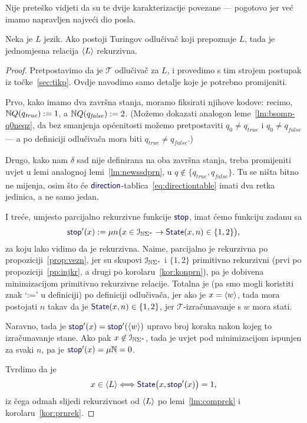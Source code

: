 Nije preteško vidjeti da su te dvije karakterizacije povezane --- pogotovo jer već imamo napravljen najveći dio posla.

\begin{teorem}\label{tm:oikr}
Neka je $L$ jezik. Ako postoji Turingov odlučivač koji prepoznaje $L$, tada je jednomjesna relacija $\langle L\rangle$ rekurzivna.
\end{teorem}
\begin{proof}
Pretpostavimo da je $\mathcal T$ odlučivač za $L$, i provedimo s tim strojem postupak iz točke~\ref{sec:tikp}. Ovdje navodimo samo detalje koje je potrebno promijeniti.

Prvo, kako imamo dva završna stanja, moramo fiksirati njihove kodove: recimo, ${\mathbb N} Q(q_\mathit{true}):=1$, a ${\mathbb N} Q(q_\mathit{false}):=2$. (Možemo dokazati analogon leme~\ref{lm:bsomp-q0neqz}, da bez smanjenja općenitosti možemo pretpostaviti $q_0\not=q_\mathit{true}$ i $q_0\not=q_\mathit{false}$ --- a po definiciji odlučivača mora biti $q_\mathit{true}\not=q_\mathit{false}$.)

Drugo, kako nam $\delta$ sad nije definirana na oba završna stanja, treba promijeniti uvjet u lemi analognoj lemi~\ref{lm:newssdprn}, u $q\not\in\{q_\mathit{true},q_\mathit{false}\}$. Tu se ništa bitno ne mijenja, osim što će $\f{direction}$-tablica~\eqref{eq:directiontable} imati dva retka jedinica, a ne samo jedan.

I treće, umjesto parcijalno rekurzivne funkcije $\f{stop}$, imat ćemo funkciju zadanu sa
\begin{equation}
    \f{stop}'(x):=\mu n\bigl(x\in\im{\N\Sigma^*}\to\f{State}(x,n)\in\{1,2\}\bigr)\text,
\end{equation}
za koju lako vidimo da je rekurzivna. Naime, parcijalno je rekurzivna po propoziciji~\ref{prop:vezn}, jer su skupovi $\mathcal I_{{\mathbb N}\Sigma^*}$ i $\{1,2\}$ primitivno rekurzivni (prvi po propoziciji~\ref{pp:injkr}, a drugi po korolaru~\ref{kor:konprn}), pa je dobivena minimizacijom primitivno rekurzivne relacije. Totalna je (pa smo mogli koristiti znak `:=' u definiciji) po definiciji odlučivača, jer ako je $x=\langle w\rangle$, tada mora postojati $n$ takav da je $\f{State}(x,n)\in\{1,2\}$, jer $\mathcal T$-izračunavanje s $w$ mora stati.

Naravno, tada je $\f{stop}'(x)=\f{stop}'(\kr w)$ upravo broj koraka nakon kojeg to iz\-ra\-ču\-na\-va\-nje stane.
Ako pak $x\not\in\mathcal I_{{\mathbb N}\Sigma^*}$, tada je uvjet pod minimizacijom ispunjen za svaki $n$, pa je $\f{stop}'(x)=\mu\N=0$.

Tvrdimo da je
\begin{equation}
    x\in\kr L\Longleftrightarrow\f{State}\bigl(x,\f{stop}'(x)\bigr)=1\text,
\end{equation}
iz čega odmah slijedi rekurzivnost od $\langle L\rangle$ po lemi~\ref{lm:comprek} i korolaru~\ref{kor:prnrek}. 


\end{proof}
